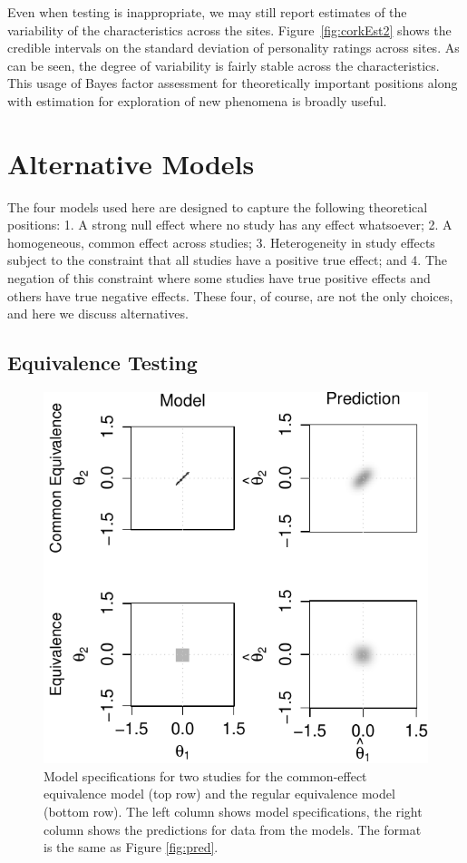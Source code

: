 \documentclass[english,man]{apa6}
\theoremstyle{definition}
\theoremstyle{definition}
\theoremstyle{remark}
\begin{document}
Even when testing is inappropriate, we may still report estimates of the
variability of the characteristics across the sites.
Figure~\ref{fig:corkEst2} shows the credible intervals on the standard
deviation of personality ratings across sites. As can be seen, the
degree of variability is fairly stable across the characteristics. This
usage of Bayes factor assessment for theoretically important positions
along with estimation for exploration of new phenomena is broadly
useful.

\section{Alternative Models}\label{alternative-models}

The four models used here are designed to capture the following
theoretical positions: 1. A strong null effect where no study has any
effect whatsoever; 2. A homogeneous, common effect across studies; 3.
Heterogeneity in study effects subject to the constraint that all
studies have a positive true effect; and 4. The negation of this
constraint where some studies have true positive effects and others have
true negative effects. These four, of course, are not the only choices,
and here we discuss alternatives.

\subsection{Equivalence Testing}\label{equivalence-testing}

\begin{figure}[htbp]
\centering
\includegraphics{p_files/figure-latex/fig-equivalence-1.pdf}
\caption{\label{fig:fig-equivalence}Model specifications for two studies for
the common-effect equivalence model (top row) and the regular
equivalence model (bottom row). The left column shows model
specifications, the right column shows the predictions for data from the
models. The format is the same as Figure \ref{fig:pred}.}
\end{figure}
\end{document}

